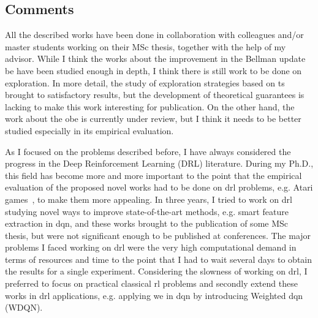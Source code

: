 \subsection{Comments}
All the described works have been done in collaboration with colleagues and/or master students working on their MSc thesis, together with the help of my advisor. While I think the works about the improvement in the Bellman update \gls{be} have been studied enough in depth, I think there is still work to be done on exploration. In more detail, the study of exploration strategies based on \gls{ts} brought to satisfactory results, but the development of theoretical guarantees is lacking to make this work interesting for publication. On the other hand, the work about the \gls{obe} is currently under review, but I think it needs to be better studied especially in its empirical evaluation.

As I focused on the problems described before, I have always considered the progress in the Deep Reinforcement Learning (DRL) literature. During my Ph.D., this field has become more and more important to the point that the empirical evaluation of the proposed novel works had to be done on \gls{drl} problems, e.g. Atari games~\cite{bellemare13arcade}, to make them more appealing. In three years, I tried to work on \gls{drl} studying novel ways to improve state-of-the-art methods, e.g. smart feature extraction in \gls{dqn}, and these works brought to the publication of some MSc thesis, but were not significant enough to be published at conferences. The major problems I faced working on \gls{drl} were the very high computational demand in terms of resources and time to the point that I had to wait several days to obtain the results for a single experiment. Considering the slowness of working on \gls{drl}, I preferred to focus on practical classical \gls{rl} problems and secondly extend these works in \gls{drl} applications, e.g. applying \gls{we} in \gls{dqn} by introducing Weighted \gls{dqn} (WDQN).

